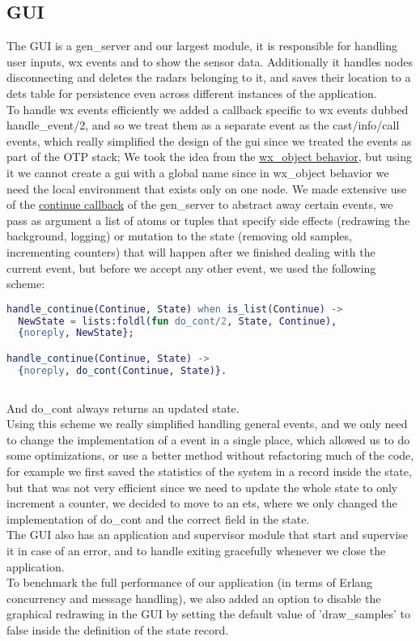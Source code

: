 \documentclass{article}
\begin{document}
\subsection{GUI}
The GUI is a gen\_server and our largest module, it is responsible for handling user inputs, wx events and to show the sensor data.
Additionally it handles nodes disconnecting and deletes the radars belonging to it, and saves their location to a dets table for persistence even across different instances of the application.\\
To handle wx events efficiently we added a callback specific to wx events dubbed handle\_event/2, and so we treat them as a separate event as the cast/info/call events, which really simplified the design of the gui since we treated the events as part of the OTP stack; We took the idea from the \href{https://www.erlang.org/doc/man/wx_object}{wx\_object behavior}, but using it we cannot create a gui with a global name since in wx\_object behavior we need the local environment that exists only on one node.
We made extensive use of the \href{https://www.erlang.org/doc/man/gen_server#Module:handle_continue-2}{continue callback} of the gen\_server to abstract away certain events, we pass as argument a list of atoms or tuples that specify side effects (redrawing the background, logging) or mutation to the state (removing old samples, incrementing counters) that will happen after we finished dealing with the current event, but before we accept any other event, we used the following scheme:
\begin{lstlisting}[language=Erlang]
handle_continue(Continue, State) when is_list(Continue) ->
  NewState = lists:foldl(fun do_cont/2, State, Continue),
  {noreply, NewState};

handle_continue(Continue, State) ->
  {noreply, do_cont(Continue, State)}.
 
\end{lstlisting}
And do\_cont always returns an updated state.\\
Using this scheme we really simplified handling general events, and we only need to change the implementation of a event in a single place, which allowed us to do some optimizations, or use a better method without refactoring much of the code, for example we first saved the statistics of the system in a record inside the state, but that was not very efficient since we need to update the whole state to only increment a counter, we decided to move to an ets, where we only changed the implementation of do\_cont and the correct field in the state.\\
The GUI also has an application and supervisor module that start and supervise it in case of an error, and to handle exiting gracefully whenever we close the application.\\
To benchmark the full performance of our application (in terms of Erlang concurrency and message handling), we also added an option to disable the graphical redrawing in the GUI by setting the default value of 'draw\_samples' to false inside the definition of the state record.
\end{document}

